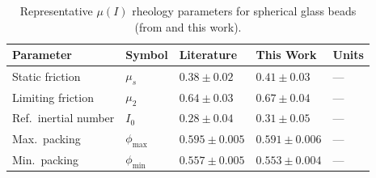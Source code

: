 \begin{table}[htbp]
\centering
\caption{Representative $\mu(I)$ rheology parameters for spherical glass beads (from \cite{Jop2006} and this work).}
\label{tab:parameters}
\begin{tabularx}{0.85\textwidth}{lXXXX}
\toprule
Parameter & Symbol & Literature & This Work & Units \\
\midrule
Static friction & $\mu_s$        & $0.38 \pm 0.02$ & $0.41 \pm 0.03$ & --- \\
Limiting friction & $\mu_2$       & $0.64 \pm 0.03$ & $0.67 \pm 0.04$ & --- \\
Ref.\ inertial number & $I_0$      & $0.28 \pm 0.04$ & $0.31 \pm 0.05$ & --- \\
Max.\ packing & $\phi_{\max}$    & $0.595 \pm 0.005$ & $0.591 \pm 0.006$ & --- \\
Min.\ packing & $\phi_{\min}$    & $0.557 \pm 0.005$ & $0.553 \pm 0.004$ & --- \\
\bottomrule
\end{tabularx}
\end{table}
